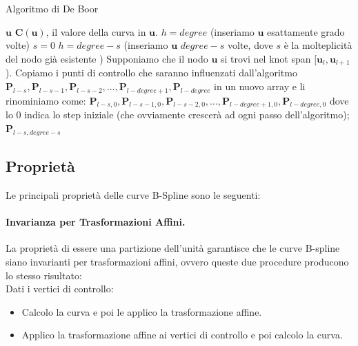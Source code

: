 \documentclass[a4paper, 12pt]{article}
\begin{document}
\begin{algorithm}
	\caption{Algoritmo di De Boor}
	\begin{algorithmic} 
		\REQUIRE $\mathbf{u}$
		\ENSURE $\mathbf{C(u)}$, il valore della curva in $\mathbf{u}$.
		\STATE $h = degree$ (inseriamo $\mathbf{u}$ esattamente grado volte)
		\STATE $s = 0$
		\ELSE
		\STATE $h = degree - s$ (inseriamo $\mathbf{u}$ $degree - s$ volte, dove $s$ è la molteplicità del nodo già esistente  )
		\ENDIF
		\STATE Supponiamo che il nodo $\mathbf{u}$ si trovi nel knot span $[\mathbf{u}_l, \mathbf{u}_{l+1}$).
		\STATE Copiamo i punti di controllo che saranno influenzati dall'algoritmo $\mathbf{P}_{l-s}, \mathbf{P}_{l-s-1}, \mathbf{P}_{l-s-2}, \dots , \mathbf{P}_{l-degree+1}, \mathbf{P}_{l-degree}$ in un nuovo array e li rinominiamo come: $\mathbf{P}_{l-s,0} , \mathbf{P}_{l-s-1,0} , \mathbf{P}_{l-s-2,0} , ... , \mathbf{P}_{l-degree+1,0} , \mathbf{P}_{l-degree,0}$ dove lo 0 indica lo step iniziale (che ovviamente crescerà ad ogni passo dell'algoritmo);
		\ENDFOR
		\RETURN $\mathbf{P}_{l-s,degree-s}$
		\label{alg:DeBoor}
	\end{algorithmic}
\end{algorithm}



\subsection{Proprietà}

Le principali proprietà delle curve B-Spline sono le seguenti:

\paragraph{Invarianza per Trasformazioni Affini.}
La proprietà di essere una partizione dell'unità garantisce che le curve B-spline siano invarianti per trasformazioni affini, ovvero queste due procedure producono lo stesso risultato:\\
Dati i vertici di controllo:
\begin{itemize}
	\item Calcolo la curva e poi le applico la trasformazione affine.
	\item Applico la trasformazione affine ai vertici di controllo e poi calcolo
	      la curva.
\end{itemize}
\end{document}

